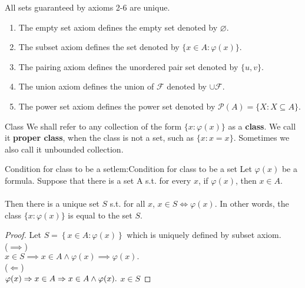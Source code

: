\begin{remark}
    All sets guaranteed by axioms 2-6 are unique. \\
    \begin{enumerate}
        \item The empty set axiom defines the empty set denoted by $\varnothing$.\\
        \item The subset axiom defines the set denoted by $\{x \in A:\varphi(x)\}$.\\
        \item The pairing axiom defines the unordered pair set denoted by $\{u, v\}$.\\
        \item The union axiom defines the union of $\mathcal{F}$ denoted by $\cup \mathcal{F}$.\\
        \item The power set axiom defines the power set denoted by $\mathcal{P}(A) = \{X:X \subseteq A\}.$
    \end{enumerate}
\end{remark}

\begin{definition}{Class}{}
    We shall refer to any collection of the form $\{x:\varphi(x)\}$ as a \textbf{class}. We call it \textbf{proper class}, 
    when the class is not a set, such as $\{x:x=x\}$. Sometimes we also call it unbounded collection.
\end{definition}

\begin{lemma}{Condition for class to be a set}{lem:Condition for class to be a set}
    Let $\varphi(x)$ be a formula. Suppose that there is a set A s.t. for every $x$, if $\varphi(x)$, then $x \in A$.\\
    \\
    Then there is a unique set $S$ s.t. for all $x$, $x \in S \iff \varphi(x)$. In other words, the class $\{x:\varphi(x)\}$ is equal to the set $S$.
\end{lemma}

\begin{proof}
    Let $S = \left\{x \in A \colon \varphi(x) \right\}$ which is uniquely defined by subset axiom.\\
    ($\implies$)\\
    $x \in S \implies x \in A \land \varphi(x) \implies \varphi(x).$\\
    ($\Leftarrow$)\\
    $\varphi(x) \implies x \in A \implies x \in A \land \varphi(x).\\$
    $x \in S$
\end{proof}

